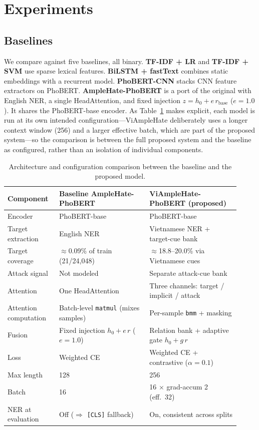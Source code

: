 \documentclass[11pt]{article}
\begin{document}
\section{Experiments}

\subsection{Baselines}
We compare against five baselines, all binary. \textbf{TF-IDF + LR} and \textbf{TF-IDF + SVM} use sparse lexical features. \textbf{BiLSTM + fastText} \citep{fasttext} combines static embeddings with a recurrent model. \textbf{PhoBERT-CNN} stacks CNN feature extractors on PhoBERT. \textbf{AmpleHate-PhoBERT} is a port of the original with English NER, a single HeadAttention, and fixed injection $z=h_0+e\,r_{\mathrm{base}}$ ($e=1.0$). It shares the PhoBERT-base encoder. As Table~\ref{tab:arch} makes explicit, each model is run at its own intended configuration---ViAmpleHate deliberately uses a longer context window (256) and a larger effective batch, which are part of the proposed system---so the comparison is between the full proposed system and the baseline as configured, rather than an isolation of individual components.

\begin{table}[t]
  \centering
  \small
  \begin{tabular}{p{0.20\linewidth} p{0.36\linewidth} p{0.36\linewidth}}
    \toprule
    \textbf{Component} & \textbf{Baseline AmpleHate-PhoBERT} & \textbf{ViAmpleHate-PhoBERT (proposed)} \\
    \midrule
    Encoder & PhoBERT-base & PhoBERT-base \\
    Target extraction & English NER & Vietnamese NER + target-cue bank \\
    Target coverage & $\approx$0.09\% of train (21/24{,}048) & $\approx$18.8--20.0\% via Vietnamese cues \\
    Attack signal & Not modeled & Separate attack-cue bank \\
    Attention & One HeadAttention & Three channels: target / implicit / attack \\
    Attention computation & Batch-level \texttt{matmul} (mixes samples) & Per-sample \texttt{bmm} + masking \\
    Fusion & Fixed injection $h_0+e\,r$ ($e{=}1.0$) & Relation bank + adaptive gate $h_0+g\,r$ \\
    Loss & Weighted CE & Weighted CE + contrastive ($\alpha{=}0.1$) \\
    Max length & 128 & 256 \\
    Batch & 16 & 16 $\times$ grad-accum 2 (eff.\ 32) \\
    NER at evaluation & Off ($\Rightarrow$ \texttt{[CLS]} fallback) & On, consistent across splits \\
    \bottomrule
  \end{tabular}
  \caption{Architecture and configuration comparison between the baseline and the proposed model.}
  \label{tab:arch}
\end{table}
\end{document}
